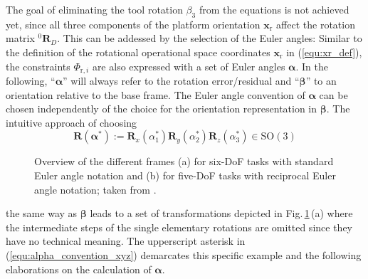 \documentclass[robotics,article,submit,moreauthors,pdftex]{Definitions/mdpi}
\newcommand{\bm}[1]{\boldsymbol{#1}}
\newcommand{\rotmat}[2]{{{ }^{#1}\boldsymbol{R}}_{#2}}
\let\Phi\varPhi
\begin{document}
The goal of eliminating the tool rotation $\beta_3$ from the equations is not achieved yet, since all three components of the platform orientation $\bm{x}_\mathrm{r}$ affect the rotation matrix $\rotmat{0}{D}$. This can be addessed by the selection of the Euler angles:
Similar to the definition of the rotational operational space coordinates $\bm{x}_\mathrm{r}$ in (\ref{equ:xr_def}), the constraints $\bm{\Phi}_{\mathrm{r},i}$ are also expressed with a set of Euler angles $\bm{\alpha}$.
In the following, ``$\bm{\alpha}$'' will always refer to the rotation error/residual and ``$\bm{\beta}$'' to an orientation relative to the base frame.
The Euler angle convention of $\bm{\alpha}$ can be chosen independently of the choice for the orientation representation in  $\bm{\beta}$.
The intuitive approach of choosing
%
\begin{equation}
\bm{R}(\bm{\alpha}^*) := \bm{R}_x(\alpha_1^*) \bm{R}_y(\alpha_2^*) \bm{R}_z(\alpha_3^*) \in \mathrm{SO(3)}
\label{equ:alpha_convention_xyz}
\end{equation}
%
\begin{figure}[b]
    
    \caption{Overview of the different frames (a) for six-DoF tasks with standard Euler angle notation and (b) for five-DoF tasks with reciprocal Euler angle notation; taken from \cite{1_SchapplerTapOrt2019}.}
    \label{fig:frames_5dof_6dof}
\end{figure} 
%
%
the same way as $\bm{\beta}$ leads to a set of transformations depicted in Fig.\,\ref{fig:frames_5dof_6dof}\,(a) where the intermediate steps of the single elementary rotations are omitted since they have no technical meaning.
The upperscript asterisk in (\ref{equ:alpha_convention_xyz}) demarcates this specific example and the following elaborations on the calculation of $\bm{\alpha}$.
\end{document}
